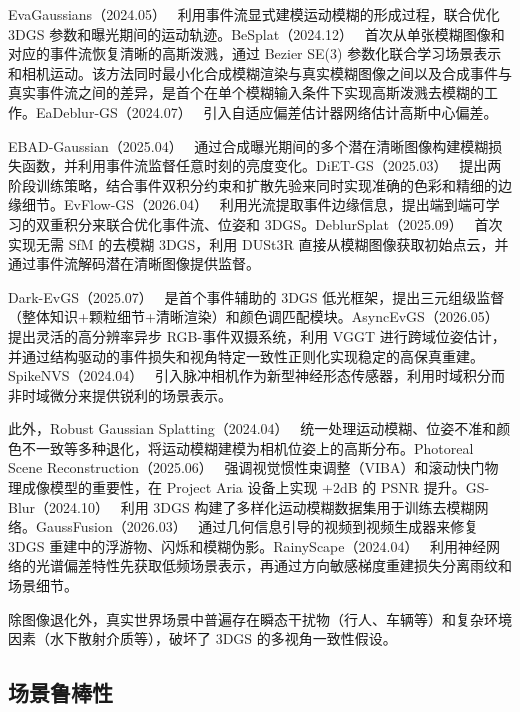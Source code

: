 EvaGaussians（2024.05）~\cite{2405_20224} 利用事件流显式建模运动模糊的形成过程，联合优化 3DGS 参数和曝光期间的运动轨迹。BeSplat（2024.12）~\cite{2412_19370} 首次从单张模糊图像和对应的事件流恢复清晰的高斯泼溅，通过 Bezier SE(3) 参数化联合学习场景表示和相机运动。该方法同时最小化合成模糊渲染与真实模糊图像之间以及合成事件与真实事件流之间的差异，是首个在单个模糊输入条件下实现高斯泼溅去模糊的工作。EaDeblur-GS（2024.07）~\cite{2407_13520} 引入自适应偏差估计器网络估计高斯中心偏差。

EBAD-Gaussian（2025.04）~\cite{2504_10012} 通过合成曝光期间的多个潜在清晰图像构建模糊损失函数，并利用事件流监督任意时刻的亮度变化。DiET-GS（2025.03）~\cite{2503_24210} 提出两阶段训练策略，结合事件双积分约束和扩散先验来同时实现准确的色彩和精细的边缘细节。EvFlow-GS（2026.04）~\cite{2604_22183} 利用光流提取事件边缘信息，提出端到端可学习的双重积分来联合优化事件流、位姿和 3DGS。DeblurSplat（2025.09）~\cite{2509_18898} 首次实现无需 SfM 的去模糊 3DGS，利用 DUSt3R 直接从模糊图像获取初始点云，并通过事件流解码潜在清晰图像提供监督。

Dark-EvGS（2025.07）~\cite{2507_11931} 是首个事件辅助的 3DGS 低光框架，提出三元组级监督（整体知识+颗粒细节+清晰渲染）和颜色调匹配模块。AsyncEvGS（2026.05）~\cite{2605_07192} 提出灵活的高分辨率异步 RGB-事件双摄系统，利用 VGGT 进行跨域位姿估计，并通过结构驱动的事件损失和视角特定一致性正则化实现稳定的高保真重建。SpikeNVS（2024.04）~\cite{2404_06710} 引入脉冲相机作为新型神经形态传感器，利用时域积分而非时域微分来提供锐利的场景表示。

此外，Robust Gaussian Splatting（2024.04）~\cite{2404_04211} 统一处理运动模糊、位姿不准和颜色不一致等多种退化，将运动模糊建模为相机位姿上的高斯分布。Photoreal Scene Reconstruction（2025.06）~\cite{2506_04444} 强调视觉惯性束调整（VIBA）和滚动快门物理成像模型的重要性，在 Project Aria 设备上实现 +2dB 的 PSNR 提升。GS-Blur（2024.10）~\cite{2410_23658} 利用 3DGS 构建了多样化运动模糊数据集用于训练去模糊网络。GaussFusion（2026.03）~\cite{2603_25053} 通过几何信息引导的视频到视频生成器来修复 3DGS 重建中的浮游物、闪烁和模糊伪影。RainyScape（2024.04）~\cite{2404_11401} 利用神经网络的光谱偏差特性先获取低频场景表示，再通过方向敏感梯度重建损失分离雨纹和场景细节。

除图像退化外，真实世界场景中普遍存在瞬态干扰物（行人、车辆等）和复杂环境因素（水下散射介质等），破坏了 3DGS 的多视角一致性假设。

\subsection{场景鲁棒性}
\label{ss:12_3b}

